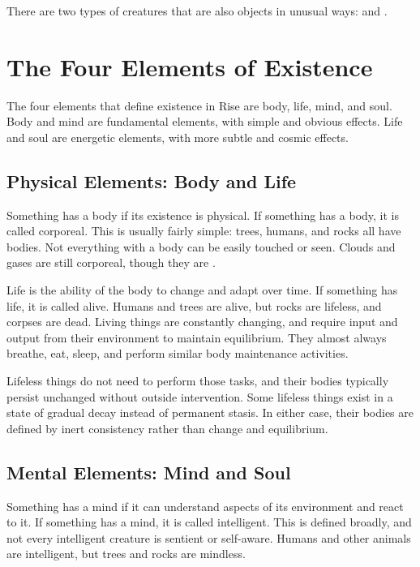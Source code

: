   There are two types of creatures that are also objects in unusual ways:  and .

\section{The Four Elements of Existence}

  The four elements that define existence in Rise are body, life, mind, and soul.
  Body and mind are fundamental elements, with simple and obvious effects.
  Life and soul are energetic elements, with more subtle and cosmic effects.

  \subsection{Physical Elements: Body and Life}
    Something has a body if its existence is physical.
    If something has a body, it is called corporeal.
    This is usually fairly simple: trees, humans, and rocks all have bodies.
    Not everything with a body can be easily touched or seen.
    Clouds and gases are still corporeal, though they are .

    Life is the ability of the body to change and adapt over time.
    If something has life, it is called alive.
    Humans and trees are alive, but rocks are lifeless, and corpses are dead.
    Living things are constantly changing, and require input and output from their environment to maintain equilibrium.
    They almost always breathe, eat, sleep, and perform similar body maintenance activities.

    Lifeless things do not need to perform those tasks, and their bodies typically persist unchanged without outside intervention.
    Some lifeless things exist in a state of gradual decay instead of permanent stasis.
    In either case, their bodies are defined by inert consistency rather than change and equilibrium.

  \subsection{Mental Elements: Mind and Soul}
    Something has a mind if it can understand aspects of its environment and react to it.
    If something has a mind, it is called intelligent.
    This is defined broadly, and not every intelligent creature is sentient or self-aware.
    Humans and other animals are intelligent, but trees and rocks are mindless.

